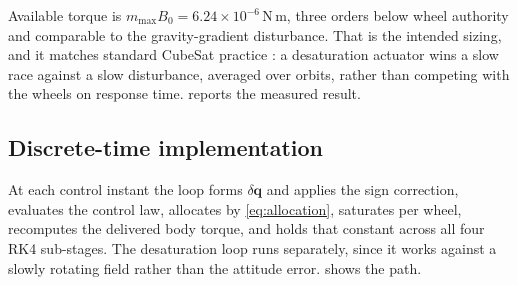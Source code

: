 \documentclass[conference,10pt,a4paper]{IEEEtran}
\newcommand{\vect}[1]{\bm{#1}}
\newcommand{\unit}[1]{\ensuremath{\,\mathrm{#1}}}
\begin{document}
Available torque is $m_\text{max}B_0 = 6.24\times10^{-6}\unit{N\,m}$, three
orders below wheel authority and comparable to the gravity-gradient
disturbance. That is the intended sizing, and it matches standard CubeSat
practice \cite{sidi,wertz}: a desaturation actuator wins a slow race against a
slow disturbance, averaged over orbits, rather than competing with the wheels
on response time.  reports the measured
result.

\subsection{Discrete-time implementation}
\label{sec:discrete}

At each control instant the loop forms $\delta\vect{q}$ and applies the sign
correction, evaluates the control law, allocates by \cref{eq:allocation},
saturates per wheel, recomputes the delivered body torque, and holds that
constant across all four RK4 sub-stages. The desaturation loop runs separately,
since it works against a slowly rotating field rather than the attitude error.
 shows the path.
\end{document}
